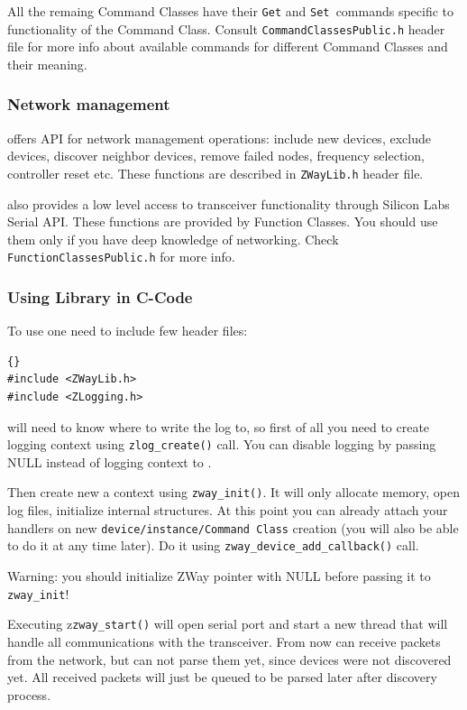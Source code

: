 All the remaing Command Classes have their \texttt{Get} and \texttt{Set }commands 
specific to functionality of the Command Class. Consult 
\texttt{CommandClassesPublic.h} header file for more info about available commands 
for different Command Classes and their meaning.

\subsubsection{Network management}

\zway offers API for network management operations: include new devices, exclude devices, 
discover neighbor devices, remove failed nodes, frequency selection, controller reset etc. 
These functions are described in \texttt{ZWayLib.h} header file.

\zway also provides a low level access to \zwave transceiver functionality through Silicon 
Labs Serial API. These functions are provided by Function Classes. You should use 
them only if you have deep knowledge of \zwave networking. Check 
\texttt{FunctionClassesPublic.h} for more info.

\subsubsection{Using \zway Library in C-Code}

To use \zway one need to include few header files:
\begin{lstlisting}[]{}
#include <ZWayLib.h>
#include <ZLogging.h>
\end{lstlisting}

\zway will need to know where to write the log to, so first of all you need to create 
logging context using \texttt{zlog\_create()} call. You can disable logging by passing NULL 
instead of logging context to \zway.

Then create new a \zway context using \texttt{zway\_init()}. It will only allocate memory, 
open log files, initialize internal structures. At this point you can already attach your 
handlers on new \texttt{device/instance/Command Class} creation (you will also be able 
to do it at any time later). Do it using \texttt{zway\_device\_add\_callback()} call. 

Warning: you should initialize ZWay pointer with NULL before passing it to \texttt{zway\_init}!

Executing z\texttt{zway\_start()} will open serial port and start a new thread that 
will handle all communications with the transceiver. From now \zway can receive packets 
from the network, but can not parse them yet, since devices were not discovered yet. 
All received packets will just be queued to be parsed later after discovery process.

